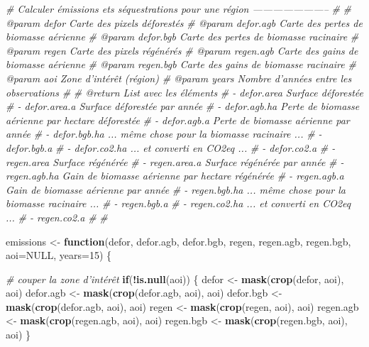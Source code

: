 \documentclass[a4paper, notitlepage, 12pt, krantz2]{krantz}
\newenvironment{Shaded}{\begin{snugshade}}{\end{snugshade}}
\newcommand{\CommentTok}[1]{\textcolor[rgb]{0.56,0.35,0.01}{\textit{#1}}}
\newcommand{\ControlFlowTok}[1]{\textcolor[rgb]{0.13,0.29,0.53}{\textbf{#1}}}
\newcommand{\DataTypeTok}[1]{\textcolor[rgb]{0.13,0.29,0.53}{#1}}
\newcommand{\DecValTok}[1]{\textcolor[rgb]{0.00,0.00,0.81}{#1}}
\newcommand{\KeywordTok}[1]{\textcolor[rgb]{0.13,0.29,0.53}{\textbf{#1}}}
\newcommand{\NormalTok}[1]{#1}
\newcommand{\OperatorTok}[1]{\textcolor[rgb]{0.81,0.36,0.00}{\textbf{#1}}}
\newcommand{\OtherTok}[1]{\textcolor[rgb]{0.56,0.35,0.01}{#1}}
\newcommand{\StringTok}[1]{\textcolor[rgb]{0.31,0.60,0.02}{#1}}
\begin{document}
\begin{Shaded}
\begin{Highlighting}[]
{\CommentTok{# Calculer émissions ets séquestrations pour une région -----------------------}
\CommentTok{#}
\CommentTok{# @param defor      Carte des pixels déforestés     }
\CommentTok{# @param defor.agb  Carte des pertes de biomasse aérienne}
\CommentTok{# @param defor.bgb  Carte des pertes de biomasse racinaire}
\CommentTok{# @param regen      Carte des pixels régénérés}
\CommentTok{# @param regen.agb  Carte des gains de biomasse aérienne}
\CommentTok{# @param regen.bgb  Carte des gains de biomasse racinaire}
\CommentTok{# @param aoi        Zone d'intérêt (région)}
\CommentTok{# @param years      Nombre d'années entre les observations}
\CommentTok{#}
\CommentTok{# @return           List avec les éléments }
\CommentTok{#                   - defor.area     Surface déforestée}
\CommentTok{#                   - defor.area.a   Surface déforestée par année}
\CommentTok{#                   - defor.agb.ha   Perte de biomasse aérienne par hectare déforestée}
\CommentTok{#                   - defor.agb.a    Perte de biomasse aérienne par année}
\CommentTok{#                   - defor.bgb.ha   ... même chose pour la biomasse racinaire ...}
\CommentTok{#                   - defor.bgb.a}
\CommentTok{#                   - defor.co2.ha   ... et converti en CO2eq ...}
\CommentTok{#                   - defor.co2.a}
\CommentTok{#                   - regen.area     Surface régénérée}
\CommentTok{#                   - regen.area.a   Surface régénérée par année}
\CommentTok{#                   - regen.agb.ha   Gain de biomasse aérienne par hectare régénérée}
\CommentTok{#                   - regen.agb.a    Gain de biomasse aérienne par année}
\CommentTok{#                   - regen.bgb.ha   ... même chose pour la biomasse racinaire ...}
\CommentTok{#                   - regen.bgb.a}
\CommentTok{#                   - regen.co2.ha   ... et converti en CO2eq ...}
\CommentTok{#                   - regen.co2.a}
\CommentTok{#}
\CommentTok{#}

\NormalTok{emissions <-}\StringTok{ }\ControlFlowTok{function}\NormalTok{(defor, defor.agb, defor.bgb, }
\NormalTok{                      regen, regen.agb, regen.bgb, }\DataTypeTok{aoi=}\OtherTok{NULL}\NormalTok{, }\DataTypeTok{years=}\DecValTok{15}\NormalTok{) \{}
  
  \CommentTok{# couper la zone d'intérêt}
  \ControlFlowTok{if}\NormalTok{(}\OperatorTok{!}\KeywordTok{is.null}\NormalTok{(aoi)) \{}
\NormalTok{    defor     <-}\StringTok{ }\KeywordTok{mask}\NormalTok{(}\KeywordTok{crop}\NormalTok{(defor, aoi), aoi)}
\NormalTok{    defor.agb <-}\StringTok{ }\KeywordTok{mask}\NormalTok{(}\KeywordTok{crop}\NormalTok{(defor.agb, aoi), aoi)}
\NormalTok{    defor.bgb <-}\StringTok{ }\KeywordTok{mask}\NormalTok{(}\KeywordTok{crop}\NormalTok{(defor.agb, aoi), aoi)}
\NormalTok{    regen     <-}\StringTok{ }\KeywordTok{mask}\NormalTok{(}\KeywordTok{crop}\NormalTok{(regen, aoi), aoi)}
\NormalTok{    regen.agb <-}\StringTok{ }\KeywordTok{mask}\NormalTok{(}\KeywordTok{crop}\NormalTok{(regen.agb, aoi), aoi)}
\NormalTok{    regen.bgb <-}\StringTok{ }\KeywordTok{mask}\NormalTok{(}\KeywordTok{crop}\NormalTok{(regen.bgb, aoi), aoi)}
\NormalTok{  \}}
  
}
\end{Highlighting}
\end{Shaded}
\end{document}
